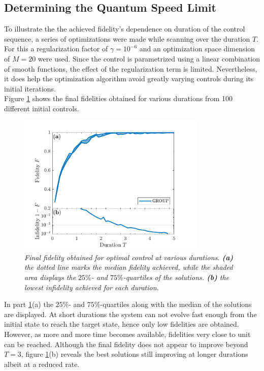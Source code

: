 \subsection{Determining the Quantum Speed Limit}
To illustrate the the achieved fidelity's dependence on duration of the control sequence, a series of optimizations were made while scanning over the duration $T$. For this a regularization factor of $\gamma = 10^{-6}$ and an optimization space dimension of $M = 20$ were used. Since the control is parametrized using a linear combination of smooth functions, the effect of the regularization term is limited. Nevertheless, it does help the optimization algorithm avoid greatly varying controls during its initial iterations.\\
Figure \ref{fig:FidelityDuration5} shows the final fidelities obtained for various durations from 100 different initial controls.
\begin{figure}[h!]
    \centering
    \includegraphics[width=0.8\textwidth]{Figures/5part/FidelityDuration.pdf}
    \caption{\textit{Final fidelity obtained for optimal control at various durations. \textbf{(a)} the dotted line marks the median fidelity achieved, while the shaded area displays the $25\%$- and $75\%$-quartiles of the solutions. \textbf{(b)} the lowest infidelity achieved for each duration. }}
    \label{fig:FidelityDuration5}
\end{figure}
In part \ref{fig:FidelityDuration5}(a) the $25\%$- and $75\%$-quartiles along with the median of the solutions are displayed. At short durations the system can not evolve fast enough from the initial state to reach the target state, hence only low fidelities are obtained. However, as more and more time becomes available, fidelities very close to unit can be reached. Although the final fidelity does not appear to improve beyond $T=3$, figure \ref{fig:FidelityDuration5}(b) reveals the best solutions still improving at longer durations albeit at a reduced rate.\\

